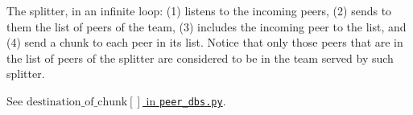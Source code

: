 
The splitter, in an infinite loop: (1) listens to the incoming peers,
(2) sends to them the list of peers of the team, (3) includes the
incoming peer to the list, and (4) send a chunk to each peer in its
list. Notice that only those peers that are in the list of peers of
the splitter are considered to be in the team served by such splitter.

\begin{notex}
  See \href{https://github.com/P2PSP/simulator/blob/f0c73be1817e7d3b816cc61cd2c8e59b17f9a0e6/src/core/splitter_dbs.py#L296}{$\text{destination\_of\_chunk}[]$ in \texttt{peer\_dbs.py}}.
\end{notex}

